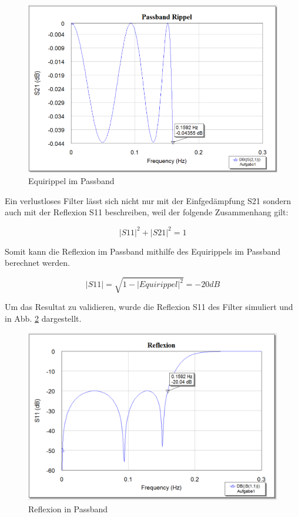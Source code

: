 \begin{figure}[h!]
\centering
 	\includegraphics[width=\imagewidth]{images/Prototyp_Passbandrippel.png}
 	\caption{Equirippel im Passband}
 	\label{fig:Prototyp_Passbandrippel}
\end{figure}

Ein verlustloses Filter lässt sich nicht nur mit der Einfgedämpfung S21 sondern auch mit der Reflexion S11 beschreiben, weil der folgende Zusammenhang gilt:

\begin{equation}
{|S11|}^2 + {|S21|}^2 = 1
\end{equation}

Somit kann die Reflexion im Passband mithilfe des Equirippels im Passband berechnet werden.

\begin{equation}
|S11| = \sqrt{1-{|Equirippel|}^2} = -20 dB
\end{equation}

Um das Resultat zu validieren, wurde die Reflexion S11 des Filter simuliert und in Abb. \ref{fig:Prototyp_Reflexion} dargestellt.

\begin{figure}[h!]
\centering
 	\includegraphics[width=\imagewidth]{images/Prototyp_Reflexion.png}
 	\caption{Reflexion in Passband}
 	\label{fig:Prototyp_Reflexion}
\end{figure}

